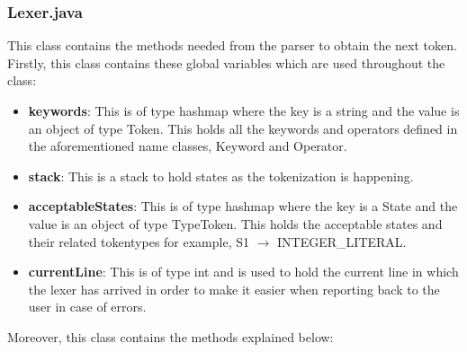 \documentclass{article}
\begin{document}
					\subsubsection{Lexer.java}
					
					This class contains the methods needed from the parser to obtain the next token. Firstly, this class contains these global variables which are used throughout the class:
					
					\begin{itemize}
						\item \textbf{keywords}: This is of type hashmap where the key is a string and the value is an object of type Token. This holds all the keywords and operators defined in the aforementioned name classes, Keyword and Operator.
						\item \textbf{stack}: This is a stack to hold states as the tokenization is happening.
						\item \textbf{acceptableStates}: This is of type hashmap where the key is a State and the value is an object of type TypeToken. This holds the acceptable states and their related tokentypes for example, S1 $\rightarrow$ INTEGER\_LITERAL.
						\item \textbf{currentLine}: This is of type int and is used to hold the current line in which the lexer has arrived in order to make it easier when reporting back to the user in case of errors.
			
					\end{itemize}
					
					Moreover, this class contains the methods explained below:
					
\end{document}
